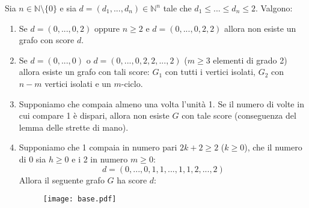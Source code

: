 \begin{tcolorbox}[enhanced, breakable, colback=red!30, colframe=red!30!black, title={Casi notevoli dopo l'applicazione del teorema dello score}]
Sia $n\in\mathbb{N}\setminus\{0\}$ e sia $d=(d_1,...,d_n)\in\mathbb{N}^n$
tale che $d_1\leq...\leq d_n\leq 2$. Valgono:
\begin{enumerate}
\item Se $d=(0,...,0,2)$ oppure $n\geq 2$ e $d=(0,...,0,2,2)$ allora
non esiste un grafo con score $d$.

\item Se $d=(0,...,0)$ o $d=(0,...,0,2,2,...,2)$ ($m\geq 3$ elementi
di grado 2) allora esiste un grafo con tali score: $G_1$ con tutti
i vertici isolati, $G_2$ con $n-m$ vertici isolati e un $m$-ciclo.

\item Supponiamo che compaia almeno una volta l'unità 1. Se il numero
di volte in cui compare 1 è dispari, allora non esiste $G$ con tale
score (conseguenza del lemma delle strette di mano).

\item Supponiamo che 1 compaia in numero pari $2k+2\geq 2$ ($k\geq 0$),
che il numero di 0 sia $h\geq0$ e i 2 in numero $m\geq0$:
\[ d=(0,...,0,1,1,...,1,1,2,...,2) \]
Allora il seguente grafo $G$ ha score $d$:
\begin{figure}[H]
\centering
\texttt{[image: base.pdf]}    
\end{figure}
\end{enumerate}
\end{tcolorbox}



